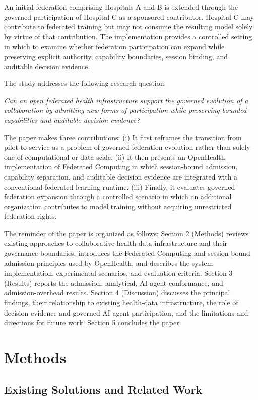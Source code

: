 \documentclass[twoside,11pt]{article}
\begin{document}
An initial federation comprising Hospitals A and B is extended through the governed participation of Hospital C as a sponsored contributor. Hospital C may contribute to federated training but may not consume the resulting model solely by virtue of that contribution. The implementation provides a controlled setting in which to examine whether federation participation can expand while preserving explicit authority, capability boundaries, session binding, and auditable decision evidence.

The study addresses the following research question.

\textit{Can an open federated health infrastructure support the governed evolution of a collaboration by admitting new forms of participation while preserving bounded capabilities and auditable decision evidence?}

The paper makes three contributions: (i) It first reframes the transition from pilot to service as a problem of governed federation evolution rather than solely one of computational or data scale. (ii) It then presents an OpenHealth implementation of Federated Computing in which session-bound admission, capability separation, and auditable decision evidence are integrated with a conventional federated learning runtime. (iii) Finally, it evaluates governed federation expansion through a controlled scenario in which an additional organization contributes to model training without acquiring unrestricted federation rights.

The reminder of the paper is organized as follows: Section 2 (Methods) reviews existing approaches to collaborative health-data infrastructure and their governance boundaries, introduces the Federated Computing and session-bound admission principles used by OpenHealth, and describes the system implementation, experimental scenarios, and evaluation criteria. Section 3 (Results) reports the admission, analytical, AI-agent conformance, and admission-overhead results. Section 4 (Discussion) discusses the principal findings, their relationship to existing health-data infrastructure, the role of decision evidence and governed AI-agent participation, and the limitations and directions for future work. Section 5 concludes the paper.


\section{Methods}
\subsection{Existing Solutions and Related Work}
\end{document}
